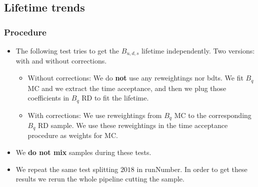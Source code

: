 %
%
%


\subsection{Lifetime trends} %

\begin{frame}
  \frametitle{Procedure}

  \begin{itemize}
    \item  The following test tries to get the $B_{u,d,s}$ lifetime
    independently. Two versions: with and without corrections.
    \begin{itemize}
      \item Without corrections: We do \textbf{not} use any reweightings nor bdts. 
      We fit $B_q$ MC and we extract the time acceptance, and then we plug those
      coefficients in $B_q$ RD to fit the lifetime.
      \item With corrections: We use reweightings from $B_q$ MC to the
      corresponding $B_q$ RD sample. We use these reweightings in the time 
      acceptance procedure as weights for MC.
    \end{itemize}
    \item We \textbf{do not mix} samples during these tests.
    \item We repeat the same test splitting $2018$ in runNumber. In order to
    get these results we rerun the whole pipeline cutting the sample.
  \end{itemize}
\end{frame}


